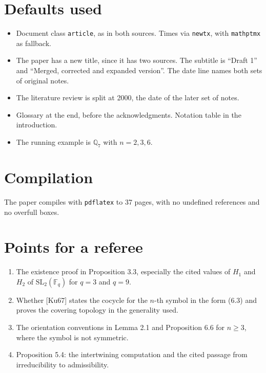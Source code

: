 \documentclass[12pt,letterpaper]{article}
\begin{document}
\section{Defaults used}
\begin{itemize}[leftmargin=2em]
\item Document class \texttt{article}, as in both sources. Times via \texttt{newtx}, with \texttt{mathptmx} as fallback.
\item The paper has a new title, since it has two sources. The subtitle is ``Draft 1'' and ``Merged, corrected and expanded version''. The date line names both sets of original notes.
\item The literature review is split at 2000, the date of the later set of notes.
\item Glossary at the end, before the acknowledgments. Notation table in the introduction.
\item The running example is $\mathbb Q_7$ with $n=2,3,6$.
\end{itemize}

\section{Compilation}
The paper compiles with \texttt{pdflatex} to 37 pages, with no undefined references and no overfull boxes.

\section{Points for a referee}
\begin{enumerate}[leftmargin=2em]
\item The existence proof in Proposition 3.3, especially the cited values of $H_1$ and $H_2$ of $\mathrm{SL}_2(\mathbb F_q)$ for $q=3$ and $q=9$.
\item Whether [Ku67] states the cocycle for the $n$-th symbol in the form (6.3) and proves the covering topology in the generality used.
\item The orientation conventions in Lemma 2.1 and Proposition 6.6 for $n\ge3$, where the symbol is not symmetric.
\item Proposition 5.4: the intertwining computation and the cited passage from irreducibility to admissibility.
\end{enumerate}
\end{document}

